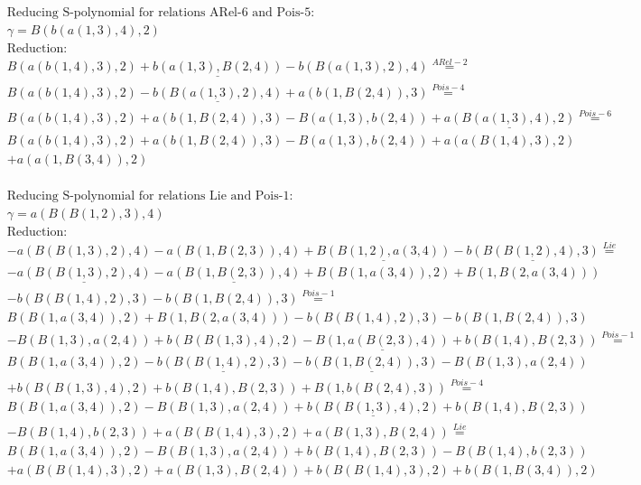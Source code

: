 \documentclass[11pt]{amsart}
\begin{document}
\begin{align*} 
& \text{Reducing S-polynomial for relations ARel-6 and Pois-5:} \\ 
& \gamma = B(b(a(1,3),4),2) \\ 
& \text{Reduction}: \\&B(a(b(1,4),3),2) + \underline{b(a(1,3),B(2,4))} - b(B(a(1,3),2),4) \stackrel{ ARel-2 }{=}  \\ 
&B(a(b(1,4),3),2) - \underline{b(B(a(1,3),2),4)} + a(b(1,B(2,4)),3) \stackrel{ Pois-4 }{=}  \\ 
&B(a(b(1,4),3),2) + a(b(1,B(2,4)),3) - B(a(1,3),b(2,4)) + \underline{a(B(a(1,3),4),2)} \stackrel{ Pois-6 }{=}  \\ 
&B(a(b(1,4),3),2) + a(b(1,B(2,4)),3) - B(a(1,3),b(2,4)) + a(a(B(1,4),3),2)\\ 
 &  + a(a(1,B(3,4)),2)\\ 
\end{align*} 
 
\begin{align*} 
& \text{Reducing S-polynomial for relations Lie and Pois-1:} \\ 
& \gamma = a(B(B(1,2),3),4) \\ 
& \text{Reduction}: \\& - a(B(B(1,3),2),4) - a(B(1,B(2,3)),4) + \underline{B(B(1,2),a(3,4))} - \underline{b(B(B(1,2),4),3)} \stackrel{ Lie }{=}  \\ 
& - \underline{a(B(B(1,3),2),4)} - \underline{a(B(1,B(2,3)),4)} + B(B(1,a(3,4)),2) + B(1,B(2,a(3,4)))\\ 
 &  - b(B(B(1,4),2),3) - b(B(1,B(2,4)),3) \stackrel{ Pois-1 }{=}  \\ 
&B(B(1,a(3,4)),2) + B(1,B(2,a(3,4))) - b(B(B(1,4),2),3) - b(B(1,B(2,4)),3)\\ 
 &  - B(B(1,3),a(2,4)) + b(B(B(1,3),4),2) - \underline{B(1,a(B(2,3),4))} + b(B(1,4),B(2,3)) \stackrel{ Pois-1 }{=}  \\ 
&B(B(1,a(3,4)),2) - \underline{b(B(B(1,4),2),3)} - \underline{b(B(1,B(2,4)),3)} - B(B(1,3),a(2,4))\\ 
 &  + b(B(B(1,3),4),2) + b(B(1,4),B(2,3)) + B(1,b(B(2,4),3)) \stackrel{ Pois-4 }{=}  \\ 
&B(B(1,a(3,4)),2) - B(B(1,3),a(2,4)) + \underline{b(B(B(1,3),4),2)} + b(B(1,4),B(2,3))\\ 
 &  - B(B(1,4),b(2,3)) + a(B(B(1,4),3),2) + a(B(1,3),B(2,4)) \stackrel{ Lie }{=}  \\ 
&B(B(1,a(3,4)),2) - B(B(1,3),a(2,4)) + b(B(1,4),B(2,3)) - B(B(1,4),b(2,3))\\ 
 &  + a(B(B(1,4),3),2) + a(B(1,3),B(2,4)) + b(B(B(1,4),3),2) + b(B(1,B(3,4)),2)\\ 
\end{align*} 
 
\end{document}
